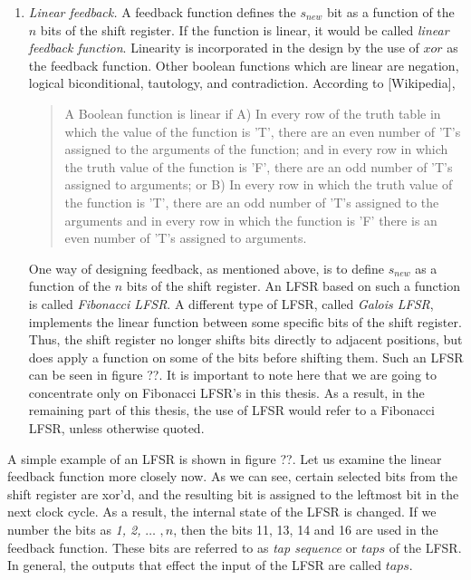 \begin{enumerate}

\item \emph{Linear feedback.} A feedback function defines the $s_{new}$ bit as a function of the $n$ bits of the shift register. If the function is linear, it would be called \emph{linear feedback function}. Linearity is incorporated in the design by the use of $xor$ as the feedback function. Other boolean functions which are linear are negation, logical biconditional, tautology, and contradiction. According to [Wikipedia], 
\begin{quote}
A Boolean function is linear if A) In every row of the truth table in which the value of the function is 'T', there are an even number of 'T's assigned to the arguments of the function; and in every row in which the truth value of the function is 'F', there are an odd number of 'T's assigned to arguments; or B) In every row in which the truth value of the function is 'T', there are an odd number of 'T's assigned to the arguments and in every row in which the function is 'F' there is an even number of 'T's assigned to arguments.
\end{quote}

One way of designing feedback, as mentioned above, is to define $s_{new}$ as a function of the $n$ bits of the shift register. An LFSR based on such a function is called \emph{Fibonacci LFSR}. A different type of LFSR, called \emph{Galois LFSR}, implements the linear function between some specific bits of the shift register. Thus, the shift register no longer shifts bits directly to adjacent positions, but does apply a function on some of the bits before shifting them. Such an LFSR can be seen in figure ??. It is important to note here that we are going to concentrate only on Fibonacci LFSR's in this thesis. As a result, in the remaining part of this thesis, the use of LFSR would refer to a Fibonacci LFSR, unless otherwise quoted.


\end{enumerate}

A simple example of an LFSR is shown in figure ??. Let us examine the linear feedback function more closely now. As we can see, certain selected bits from the shift register are xor'd, and the resulting bit is assigned to the leftmost bit in the next clock cycle. As a result, the internal state of the LFSR is changed. If we number the bits as \emph{1, 2,} $\ldots$ $, n$, then the bits 11, 13, 14 and 16 are used in the feedback function. These bits are referred to as \emph{tap sequence} or $taps$ of the LFSR. In general, the outputs that effect the input of the LFSR are called $taps$.

